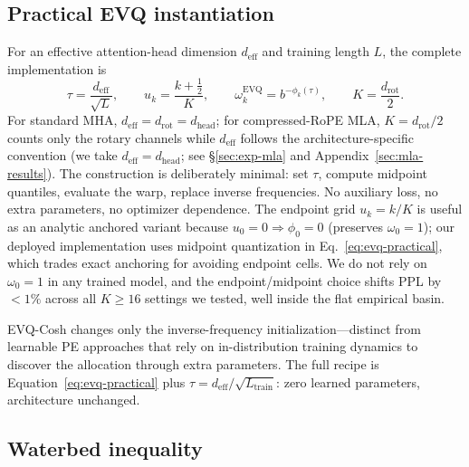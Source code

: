 \subsection{Practical EVQ instantiation}
\label{sec:evq-practical}

For an effective attention-head dimension $d_{\mathrm{eff}}$ and training length $L$, the complete implementation is
\begin{equation}
\label{eq:evq-practical}
\tau = \frac{d_{\mathrm{eff}}}{\sqrt{L}},
\qquad
u_k = \frac{k+\tfrac{1}{2}}{K},
\qquad
\omega_k^{\mathrm{EVQ}} = b^{-\phi_k(\tau)},
\qquad
K=\frac{d_{\mathrm{rot}}}{2}.
\end{equation}
For standard MHA, $d_{\mathrm{eff}}{=}d_{\mathrm{rot}}{=}d_{\mathrm{head}}$; for compressed-RoPE MLA, $K{=}d_{\mathrm{rot}}/2$ counts only the rotary channels while $d_{\mathrm{eff}}$ follows the architecture-specific convention (we take $d_{\mathrm{eff}}{=}d_{\mathrm{head}}$; see \S\ref{sec:exp-mla} and Appendix~\ref{sec:mla-results}). The construction is deliberately minimal: set $\tau$, compute midpoint quantiles, evaluate the warp, replace inverse frequencies. No auxiliary loss, no extra parameters, no optimizer dependence. The endpoint grid $u_k{=}k/K$ is useful as an analytic anchored variant because $u_0{=}0{\Rightarrow}\phi_0{=}0$ (preserves $\omega_0{=}1$); our deployed implementation uses midpoint quantization in Eq.~\eqref{eq:evq-practical}, which trades exact anchoring for avoiding endpoint cells. We do not rely on $\omega_0{=}1$ in any trained model, and the endpoint/midpoint choice shifts PPL by ${<}1\%$ across all $K{\geq}16$ settings we tested, well inside the flat empirical basin.

EVQ-Cosh changes only the inverse-frequency initialization---distinct from learnable PE approaches that rely on in-distribution training dynamics to discover the allocation through extra parameters. The full recipe is Equation~\eqref{eq:evq-practical} plus $\tau{=}d_{\mathrm{eff}}/\sqrt{L_{\mathrm{train}}}$: zero learned parameters, architecture unchanged.

\subsection{Waterbed inequality}
\label{sec:waterbed}

